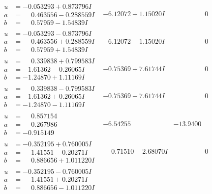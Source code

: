 \documentclass[1p]{elsarticle_modified}
\theoremstyle{definition}
\begin{document}
$$\begin{array}{c|c|c}
\begin{aligned}
u &= -0.053293 + 0.873796 I \\
a &= \phantom{-}0.463556 - 0.288559 I \\
b &= \phantom{-}0.57959 - 1.54839 I\end{aligned}
 & -6.12072 + 1.15020 I & \phantom{-0.000000 } 0 \\ \hline\begin{aligned}
u &= -0.053293 - 0.873796 I \\
a &= \phantom{-}0.463556 + 0.288559 I \\
b &= \phantom{-}0.57959 + 1.54839 I\end{aligned}
 & -6.12072 - 1.15020 I & \phantom{-0.000000 } 0 \\ \hline\begin{aligned}
u &= \phantom{-}0.339838 + 0.799583 I \\
a &= -1.61362 - 0.26065 I \\
b &= -1.24870 + 1.11169 I\end{aligned}
 & -0.75369 + 7.61744 I & \phantom{-0.000000 } 0 \\ \hline\begin{aligned}
u &= \phantom{-}0.339838 - 0.799583 I \\
a &= -1.61362 + 0.26065 I \\
b &= -1.24870 - 1.11169 I\end{aligned}
 & -0.75369 - 7.61744 I & \phantom{-0.000000 } 0 \\ \hline\begin{aligned}
u &= \phantom{-}0.857154\phantom{ +0.000000I} \\
a &= \phantom{-}0.267986\phantom{ +0.000000I} \\
b &= -0.915149\phantom{ +0.000000I}\end{aligned}
 & -6.54255\phantom{ +0.000000I} & -13.9400\phantom{ +0.000000I} \\ \hline\begin{aligned}
u &= -0.352195 + 0.760005 I \\
a &= \phantom{-}1.41551 - 0.20271 I \\
b &= \phantom{-}0.886656 + 1.011220 I\end{aligned}
 & \phantom{-}0.71510 - 2.68070 I & \phantom{-0.000000 } 0 \\ \hline\begin{aligned}
u &= -0.352195 - 0.760005 I \\
a &= \phantom{-}1.41551 + 0.20271 I \\
b &= \phantom{-}0.886656 - 1.011220 I\end{aligned}

\end{array}$$
\end{document}
